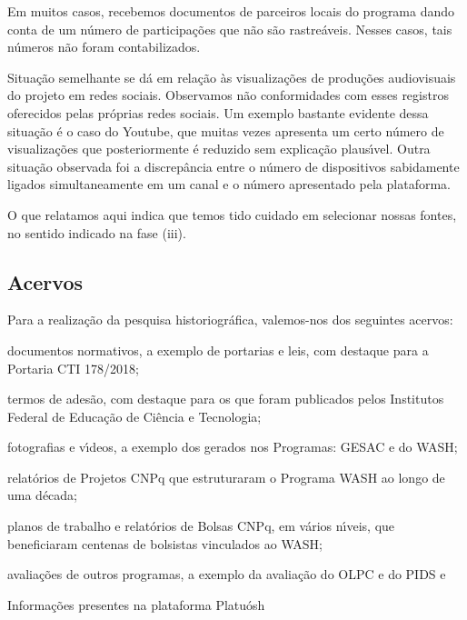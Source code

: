 \documentclass[
12pt,		%
openright,	%
twoside,  %
a4paper,			%
chapter=TITLE,		%
english,			%
french,				%
spanish,			%
brazil				%
]{USPSC-classe/USPSC}
\begin{document}
Em muitos casos, recebemos documentos de parceiros locais do programa dando conta de um n\'umero de participa\c{c}\~oes que n\~ao s\~ao rastre\'aveis. Nesses casos, tais n\'umeros n\~ao foram contabilizados.








Situa\c{c}\~ao semelhante se d\'a em rela\c{c}\~ao \`as visualiza\c{c}\~oes de produ\c{c}\~oes audiovisuais do projeto em redes sociais. Observamos n\~ao conformidades com esses registros oferecidos pelas pr\'oprias redes sociais. Um exemplo bastante evidente dessa situa\c{c}\~ao \'e o caso do Youtube, que muitas vezes apresenta um certo n\'umero de visualiza\c{c}\~oes que posteriormente \'e reduzido sem explica\c{c}\~ao plaus\'{\i}vel. Outra situa\c{c}\~ao observada foi a discrep\^ancia entre o n\'umero de dispositivos sabidamente ligados simultaneamente em um canal e o n\'umero apresentado pela plataforma.








O que relatamos aqui indica que temos tido cuidado em selecionar nossas fontes, no sentido indicado na fase (iii).








\subsection[Acervos]{Acervos}\label{Acervos}
Para a realiza\c{c}\~ao da pesquisa historiogr\'afica, valemos-nos dos seguintes acervos:









\begin{alineas}
\item documentos normativos, a exemplo de portarias e leis, com destaque para a Portaria CTI 178/2018;
\item termos de ades\~ao, com destaque para os que foram publicados pelos  Institutos Federal de Educa\c{c}\~ao de Ci\^encia e Tecnologia;
\item fotografias e v\'{\i}deos, a exemplo dos gerados nos Programas: GESAC e do WASH;
\item relat\'orios de Projetos CNPq que estruturaram o Programa WASH ao longo de uma d\'ecada;
\item planos de trabalho e relat\'orios de Bolsas CNPq, em v\'arios n\'{\i}veis, que beneficiaram centenas de bolsistas vinculados ao WASH;
\item avalia\c{c}\~oes de outros programas, a exemplo da avalia\c{c}\~ao do OLPC e do PIDS e
\item Informa\c{c}\~oes presentes na plataforma Platu\'osh
\end{alineas}
\end{document}
